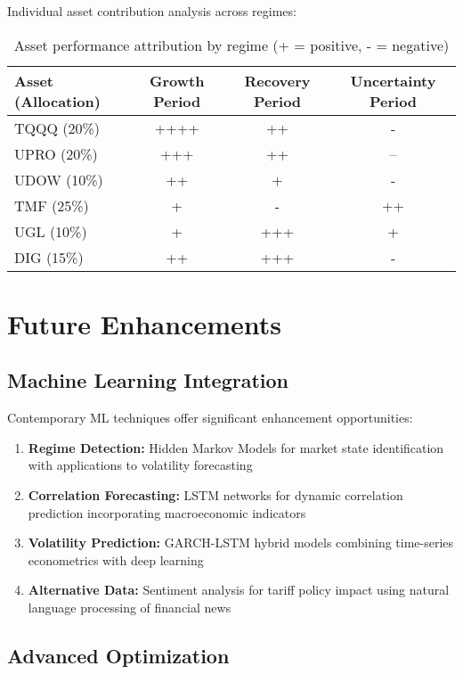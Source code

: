 \documentclass[onecolumn,11pt]{IEEEtran}
\begin{document}
Individual asset contribution analysis across regimes:

\begin{table}[h]
\centering
\begin{tabular}{lccc}
\toprule
\textbf{Asset (Allocation)} & \textbf{Growth Period} & \textbf{Recovery Period} & \textbf{Uncertainty Period} \\
\midrule
TQQQ (20\%) & ++++ & ++ & - \\
UPRO (20\%) & +++ & ++ & -- \\
UDOW (10\%) & ++ & + & - \\
TMF (25\%) & + & - & ++ \\
UGL (10\%) & + & +++ & + \\
DIG (15\%) & ++ & +++ & - \\
\bottomrule
\end{tabular}
\caption{Asset performance attribution by regime (+ = positive, - = negative)}
\end{table}

\section{Future Enhancements}

\subsection{Machine Learning Integration}

Contemporary ML techniques offer significant enhancement opportunities:
\begin{enumerate}
    \item \textbf{Regime Detection:} Hidden Markov Models for market state identification with applications to volatility forecasting
    \item \textbf{Correlation Forecasting:} LSTM networks for dynamic correlation prediction incorporating macroeconomic indicators
    \item \textbf{Volatility Prediction:} GARCH-LSTM hybrid models combining time-series econometrics with deep learning
    \item \textbf{Alternative Data:} Sentiment analysis for tariff policy impact using natural language processing of financial news
\end{enumerate}

\subsection{Advanced Optimization}
\end{document}
